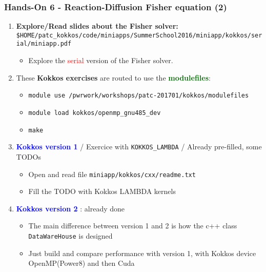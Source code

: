 \begin{frame}
  \frametitle{Hands-On 6 - Reaction-Diffusion Fisher equation (2)}

  \begin{enumerate}
  \item \textbf{Explore/Read slides about the Fisher solver:}\\
    {\footnotesize \texttt{\$HOME/patc\_kokkos/code/miniapps/SummerSchool2016/miniapp/kokkos/serial/miniapp.pdf}}
    \begin{itemize}
    \item Explore the \textcolor{red}{serial} version of the Fisher solver.
    \end{itemize}
  \item These \textbf{Kokkos exercises} are routed to use the \textcolor{darkgreen}{\textbf{modulefiles}}:
    \begin{itemize}
    \item \texttt{module use /pwrwork/workshops/patc-201701/kokkos/modulefiles}
    \item \texttt{module load kokkos/openmp\_gnu485\_dev}
    \item \texttt{make}
    \end{itemize}
  \item \textcolor{blue}{\textbf{Kokkos version 1}} / Exercice with \texttt{KOKKOS\_LAMBDA} / Already pre-filled, some TODOs
    \begin{itemize}
    \item Open and read file \texttt{miniapp/kokkos/cxx/readme.txt}
    \item Fill the TODO with Kokkos LAMBDA kernels
    \end{itemize}
  \item \textcolor{blue}{\textbf{Kokkos version 2}} : already done
    \begin{itemize}
    \item The main difference between version 1 and 2 is how the c++ class \texttt{DataWareHouse} is designed
    \item Just build and compare performance with version 1, with Kokkos device OpenMP(Power8) and then Cuda
    \end{itemize}
  \end{enumerate}
\end{frame}
